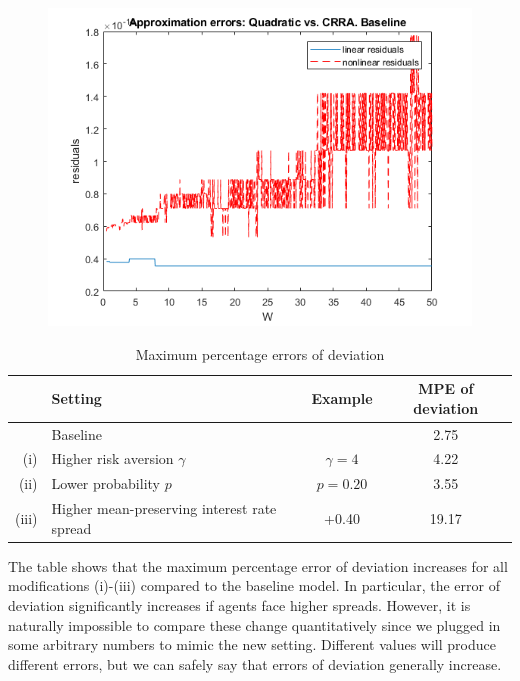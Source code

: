 \documentclass{article}
\begin{document}
\begin{figure}[h!]
\includegraphics[width = .8\textwidth, keepaspectratio]{ps4ex2fig2.png}
\end{figure}

\begin{table}[h!]
\centering
\caption{Maximum percentage errors of deviation}
\vspace{.5cm}
\begin{tabular}{rlcc}
\hline
 & Setting & Example & MPE of deviation \\[.5em]
 \hline
 & Baseline & & 2.75 \\[1em]
 (i) & Higher risk aversion $\gamma$ & $\gamma = 4$ & 4.22 \\[1em]
 (ii) & Lower probability $p$ & $p = 0.20$ & 3.55 \\[1em]
 (iii) & Higher mean-preserving interest rate spread & +0.40 & 19.17\\[1em]
 \hline
\end{tabular}
\end{table}

The table shows that the maximum percentage error of deviation increases for all modifications (i)-(iii) compared to the baseline model. In particular, the error of deviation significantly increases if agents face higher spreads. However, it is naturally impossible to compare these change quantitatively since we plugged in some arbitrary numbers to mimic the new setting. Different values will produce different errors, but we can safely say that errors of deviation generally increase.
\end{document}
